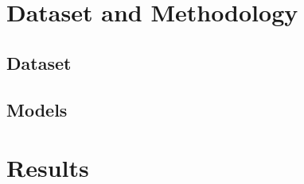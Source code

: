 \documentclass[12pt,a4paper]{report}
\begin{document}
\section{}

\chapter{Dataset and Methodology}

\section{Dataset}

\section{Models}

\chapter{Results}


\newpage
\nocite{*}


\end{document}
